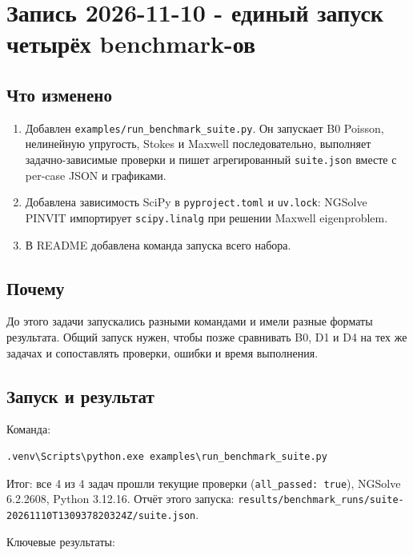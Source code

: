 \documentclass[11pt,a4paper]{article}
\begin{document}
\section{Запись 2026-11-10 - единый запуск четырёх benchmark-ов}

\subsection{Что изменено}

\begin{enumerate}
    \item Добавлен \texttt{examples/run\_benchmark\_suite.py}. Он запускает B0 Poisson, нелинейную упругость, Stokes и Maxwell последовательно, выполняет задачно-зависимые проверки и пишет агрегированный \texttt{suite.json} вместе с per-case JSON и графиками.
    \item Добавлена зависимость SciPy в \texttt{pyproject.toml} и \texttt{uv.lock}: NGSolve PINVIT импортирует \texttt{scipy.linalg} при решении Maxwell eigenproblem.
    \item В README добавлена команда запуска всего набора.
\end{enumerate}

\subsection{Почему}

До этого задачи запускались разными командами и имели разные форматы результата. Общий запуск нужен, чтобы позже сравнивать B0, D1 и D4 на тех же задачах и сопоставлять проверки, ошибки и время выполнения.

\subsection{Запуск и результат}

Команда:

\begin{lstlisting}
.venv\Scripts\python.exe examples\run_benchmark_suite.py
\end{lstlisting}

Итог: все 4 из 4 задач прошли текущие проверки (\texttt{all\_passed: true}), NGSolve 6.2.2608, Python 3.12.16. Отчёт этого запуска: \texttt{results/benchmark\_runs/suite-20261110T130937820324Z/suite.json}.

Ключевые результаты:
\end{document}
